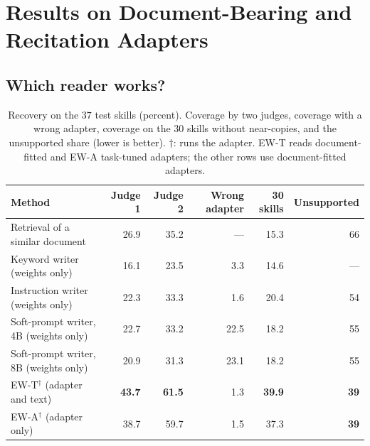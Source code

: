 \documentclass[11pt]{article}
\newcommand{\best}[1]{\textbf{#1}}
\newcommand{\EWT}{\textsc{EW-T}}
\newcommand{\EWA}{\textsc{EW-A}}
\begin{document}
\section{Results on Document-Bearing and Recitation Adapters}
\label{sec:res-doc}

\subsection{Which reader works?}
\label{sec:res-readers}

\begin{table}[!htb]
\centering
\caption{Recovery on the $37$ test skills (percent). Coverage by two judges, coverage with a wrong adapter, coverage on the $30$ skills without
near-copies, and the unsupported share (lower is better). $\dagger$: runs the adapter. \EWT{} reads document-fitted and \EWA{} task-tuned
adapters; the other rows use document-fitted adapters.}
\label{tab:main}
\small
\setlength{\tabcolsep}{3.5pt}
\begin{tabular}{lrrrrr}
\toprule
Method & Judge 1 & Judge 2 & Wrong adapter & 30 skills & Unsupported\\
\midrule
Retrieval of a similar document                    & 26.9 & 35.2 & --- & 15.3 & 66 \\
Keyword writer (weights only)                      & 16.1 & 23.5 & 3.3 & 14.6 & --- \\
Instruction writer (weights only)                  & 22.3 & 33.3 & 1.6 & 20.4 & 54 \\
Soft-prompt writer, 4B (weights only)              & 22.7 & 33.2 & 22.5 & 18.2 & 55 \\
Soft-prompt writer, 8B (weights only)              & 20.9 & 31.3 & 23.1 & 18.2 & 55 \\
\midrule
\EWT$^\dagger$ (adapter and text)                  & \best{43.7} & \best{61.5} & 1.3 & \best{39.9} & \best{39} \\
\EWA$^\dagger$ (adapter only)                      & 38.7 & 59.7 & 1.5 & 37.3 & \best{39} \\
\bottomrule
\end{tabular}
\end{table}
\end{document}
